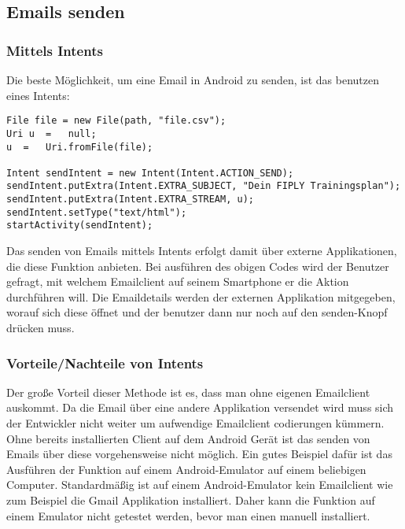 \documentclass[FIPLY_base.tex]{subfiles}
\begin{document}
\subsection{Emails senden}
\subsubsection{Mittels Intents}
Die beste Möglichkeit, um eine Email in Android zu senden, ist das benutzen eines Intents:
\begin{lstlisting}[caption={Verwendung von CSVWriter: Möglichkeit 2, alles auf einmal},label=DescriptiveLabel]
File file = new File(path, "file.csv");
Uri u  =   null;
u  =   Uri.fromFile(file);

Intent sendIntent = new Intent(Intent.ACTION_SEND);
sendIntent.putExtra(Intent.EXTRA_SUBJECT, "Dein FIPLY Trainingsplan");
sendIntent.putExtra(Intent.EXTRA_STREAM, u);
sendIntent.setType("text/html");
startActivity(sendIntent);
\end{lstlisting}
Das senden von Emails mittels Intents erfolgt damit über externe Applikationen, die diese Funktion anbieten. Bei ausführen des obigen Codes wird der Benutzer gefragt, mit welchem Emailclient auf seinem Smartphone er die Aktion durchführen will. Die Emaildetails werden der externen Applikation mitgegeben, worauf sich diese öffnet und der benutzer dann nur noch auf den \grqq{}senden\grqq{}-Knopf drücken muss. 
\subsubsection{Vorteile/Nachteile von Intents}
Der große Vorteil dieser Methode ist es, dass man ohne eigenen Emailclient auskommt. Da die Email über eine andere Applikation versendet wird muss sich der Entwickler nicht weiter um aufwendige Emailclient codierungen kümmern. 
\ \\
Ohne bereits installierten Client auf dem Android Gerät ist das senden von Emails über diese vorgehensweise nicht möglich. Ein gutes Beispiel dafür ist das Ausführen der Funktion auf einem Android-Emulator auf einem beliebigen Computer. Standardmäßig ist auf einem Android-Emulator kein Emailclient wie zum Beispiel die Gmail Applikation installiert. Daher kann die Funktion auf einem Emulator nicht getestet werden, bevor man einen manuell installiert. 
\ \\
\end{document}
